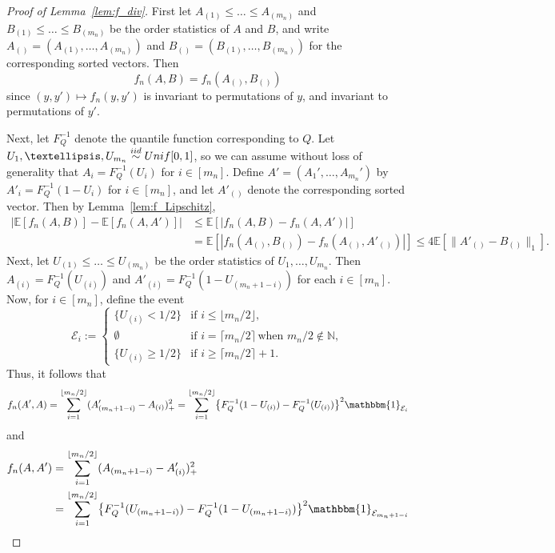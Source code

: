 \documentclass[12pt]{article}
\newcommand{\EE}[1]{\mathbb{E}\left[{#1}\right]}
\newcommand{\one}[1]{{\mathbbm{1}}_{{#1}}}
\newcommand{\iidsim}{\stackrel{\textnormal{iid}}{\sim}}
\begin{document}
\begin{proof}[Proof of Lemma~\ref{lem:f_div}]
First let $A_{(1)} \leq \dots \leq A_{(m_n)}$ and $B_{(1)}\leq \dots \leq B_{(m_n)}$ be the order statistics of $A$ and $B$, and write $A_{()} = (A_{(1)},\dots,A_{(m_n)})$ and $B_{()} = (B_{(1)},\dots,B_{(m_n)})$ for the corresponding sorted vectors. Then
\[
f_n(A,B) = f_n(A_{()},B_{()})
\]
since $(y,y') \mapsto f_n(y,y')$ is invariant to permutations of $y$, and invariant to permutations of $y'$. 

Next, let $F_Q^{-1}$ denote the quantile function corresponding to $Q$. Let $U_1,\dots,U_{m_n}\iidsim \textnormal{Unif}[0,1]$, so we can assume without loss of generality that $A_i = F_Q^{-1}(U_i)$ for $i \in [m_n]$. Define $A' = (A_1',\ldots,A_{m_n}')$ by $A'_i = F_Q^{-1}(1-U_i)$ for $i \in [m_n]$, and let $A'_{()}$ denote the corresponding sorted vector. Then by Lemma~\ref{lem:f_Lipschitz},
\begin{align}\label{eq:f_n-split-1}
    \bigl|\EE{f_n(A,B)} - \EE{f_n(A,A')}\bigr|&\leq \EE{\left|f_n(A,B) - f_n(A,A')\right|}\nonumber\\
    &= \EE{\left|f_n(A_{()},B_{()}) - f_n(A_{()},A'_{()})\right|} \leq 4\EE{\|A'_{()}-B_{()}\|_1}.
\end{align}
Next, let $U_{(1)}\leq \dots \leq U_{(m_n)}$ be the order statistics of $U_1,\ldots,U_{m_n}$. Then $A_{(i)} = F_Q^{-1}(U_{(i)})$ and $A'_{(i)} = F_Q^{-1}(1-U_{(m_n+1-i)})$ for each $i \in [m_n]$. Now, for $i \in [m_n]$, define the event
\[
\mathcal{E}_i:=\begin{cases}
    \{U_{(i)} < 1/2\} & \text{if } i \leq \lfloor m_n/2 \rfloor,\\
    \emptyset &\text{if } i=\lceil m_n/2\rceil\, \text{when } m_n/2\notin \mathbb{N},\\
    \{U_{(i)} \geq 1/2\} &\text{if } i\geq \lceil m_n/2\rceil+1.
\end{cases}
\]
Thus, it follows that 
\begin{align*}
    f_n(A',A) = \sum_{i=1}^{\lfloor m_n/2\rfloor} (A'_{(m_n+1-i)} - A_{(i)})^2_+ = \sum_{i=1}^{\lfloor m_n/2\rfloor}
\bigl\{F_Q^{-1}(1-U_{(i)}) - F_Q^{-1}(U_{(i)})\bigr\}^2\one{\mathcal{E}_i}
\end{align*}
and
\begin{align*}
f_n(A,A') &= \sum_{i=1}^{\lfloor m_n/2\rfloor} (A_{(m_n+1-i)} - A'_{(i)})^2_+ \\
&= \sum_{i=1}^{\lfloor m_n/2\rfloor}
\bigl\{F_Q^{-1}(U_{(m_n+1-i)}) - F_Q^{-1}(1-U_{(m_n+1-i)})\bigr\}^2\one{\mathcal{E}_{m_n+1-i}}\\

\end{align*}
\end{proof}
\end{document}
